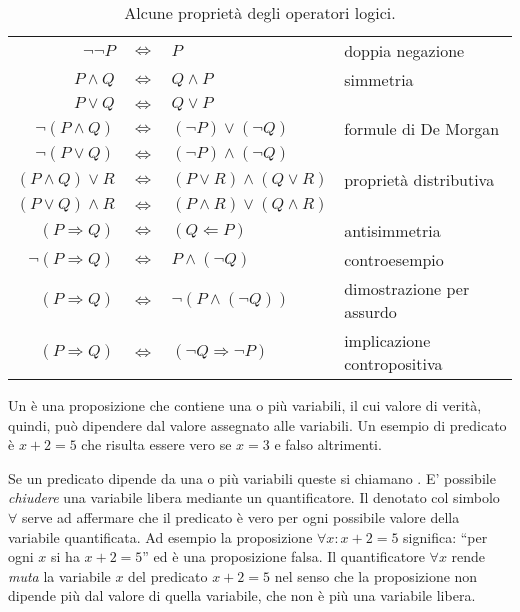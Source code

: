 \begin{table}
\begin{tabular}{rcll}
                         $\neg \neg P$ & $\iff$ & $ P$                           & doppia negazione\\
                                    $P \land Q$ & $\iff$ & $ Q \land P$                   & simmetria\\
                                     $P \lor Q$ & $\iff$ & $ Q \lor P$                    & \\
                              $\neg (P\land Q)$ & $\iff$ & $ (\neg P) \lor (\neg Q)$      & formule di De Morgan\\
                               $\neg (P\lor Q)$ & $\iff$ & $ (\neg P) \land (\neg Q)$     & \\
                            $(P\land Q) \lor R$ & $\iff$ & $ (P\lor R) \land (Q \lor R)$  & proprietà distributiva\\
                            $(P\lor Q) \land R$ & $\iff$ & $ (P\land R) \lor (Q \land R)$ & \\
                            $(P \Rightarrow Q)$ & $\iff$ & $ (Q \Leftarrow P)$            & antisimmetria\\
                        $\neg (P\Rightarrow Q)$ & $\iff$ & $ P \land (\neg Q)$            & controesempio\\
                             $(P\Rightarrow Q)$ & $\iff$ & $ \lnot(P \land (\neg Q))$     & dimostrazione per assurdo\\
                             $(P\Rightarrow Q)$ & $\iff$ & $ (\neg Q\Rightarrow\neg P)$   & implicazione contropositiva
\end{tabular}
\caption{Alcune proprietà degli operatori logici.}
\label{tab:operatori_logici}
\end{table}

Un  è una proposizione che contiene
una o più variabili, il cui valore di verità, quindi,
può dipendere dal valore assegnato alle variabili.
Un esempio di predicato è $x+2=5$ che risulta essere vero se $x=3$
e falso altrimenti.

Se un predicato dipende da una o più variabili queste
si chiamano . E' possibile
\emph{chiudere} una variabile libera mediante un quantificatore.
Il  denotato col simbolo
$\forall$ serve ad affermare che il predicato è vero
per ogni possibile valore della variabile quantificata.
Ad esempio la proposizione $\forall x\colon x+2=5$ significa:
``per ogni $x$ si ha $x+2=5$'' ed è una proposizione falsa.
Il quantificatore $\forall x$ rende \emph{muta} la variabile
$x$ del predicato $x+2=5$ nel senso che la proposizione
non dipende più dal valore di quella variabile, che non è
più una variabile libera.

